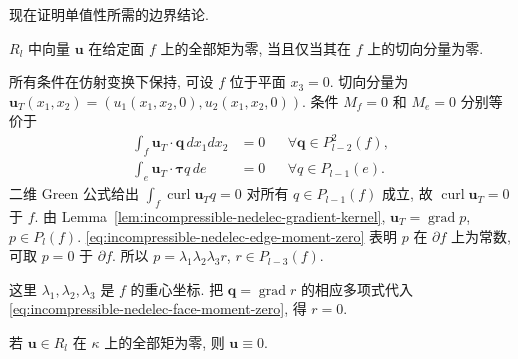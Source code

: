 现在证明单值性所需的边界结论.
\begin{Lemma}\label{lem:incompressible-nedelec-face-unisolvence}
$R_l$ 中向量 $\mathbf u$ 在给定面 $f$ 上的全部矩为零,
当且仅当其在 $f$ 上的切向分量为零.
\end{Lemma}

\begin{Proof}
所有条件在仿射变换下保持, 可设 $f$ 位于平面 $x_3=0$.
切向分量为
$\mathbf u_T(x_1,x_2)=(u_1(x_1,x_2,0),u_2(x_1,x_2,0))$.
条件 $M_f=0$ 和 $M_e=0$ 分别等价于
\begin{align}
\int_f\mathbf u_T\cdot\mathbf q\,dx_1dx_2&=0
&&\forall\mathbf q\in P_{l-2}^2(f),
\label{eq:incompressible-nedelec-face-moment-zero}\\
\int_e\mathbf u_T\cdot\boldsymbol\tau q\,de&=0
&&\forall q\in P_{l-1}(e).
\label{eq:incompressible-nedelec-edge-moment-zero}
\end{align}
二维 Green 公式给出
$\int_f\operatorname{curl}\mathbf u_Tq=0$
对所有 $q\in P_{l-1}(f)$ 成立, 故
$\operatorname{curl}\mathbf u_T=0$ 于 $f$.
由 Lemma~\ref{lem:incompressible-nedelec-gradient-kernel},
$\mathbf u_T=\operatorname{grad}p$, $p\in P_l(f)$.
\eqref{eq:incompressible-nedelec-edge-moment-zero}
表明 $p$ 在 $\partial f$ 上为常数, 可取 $p=0$ 于 $\partial f$.
所以 $p=\lambda_1\lambda_2\lambda_3r$,
$r\in P_{l-3}(f)$.

这里 $\lambda_1,\lambda_2,\lambda_3$ 是 $f$ 的重心坐标.
把 $\mathbf q=\operatorname{grad}r$ 的相应多项式代入
\eqref{eq:incompressible-nedelec-face-moment-zero}, 得 $r=0$.
\end{Proof}

\begin{Lemma}\label{lem:incompressible-nedelec-tetrahedron-unisolvence}
若 $\mathbf u\in R_l$ 在 $\kappa$ 上的全部矩为零,
则 $\mathbf u\equiv0$.
\end{Lemma}

